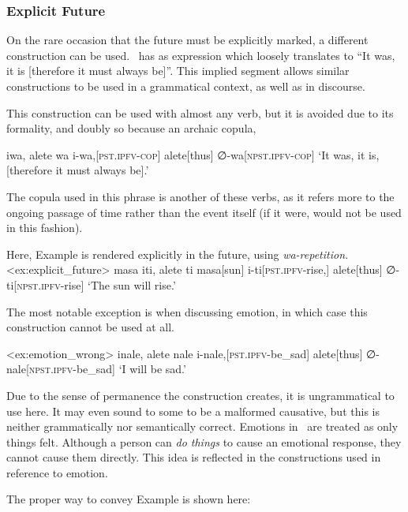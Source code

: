 \subsubsection{Explicit Future}
On the rare occasion that the future must be explicitly marked, a different construction can be used.
\langname\ has as expression which loosely translates to ``It was, it is [therefore it must always be]''.
This implied segment allows similar constructions to be used in a grammatical context, as well as in discourse.

This construction can be used with almost any verb, but it is avoided due to its formality, and doubly so because an archaic copula, 

\ex
\begingl
\glpreamble iwa, alete wa
\endpreamble
i-wa,[\textsc{pst.ipfv-cop}]
alete[thus]
∅-wa[\textsc{npst.ipfv-cop}]
\glft `It was, it is, [therefore it must always be].'
\endgl
\xe

The copula used in this phrase is another of these verbs, as it refers more to the ongoing passage of time rather than the event itself (if it were,  would not be used in this fashion).

Here, Example  is rendered explicitly in the future, using \textit{wa-repetition.}
\ex<ex:explicit_future>
\begingl
\glpreamble masa iti, alete ti
\endpreamble
masa[sun]
i-ti[\textsc{pst.ipfv-}rise,]
alete[thus]
∅-ti[\textsc{npst.ipfv-}rise]
\glft `The sun will rise.'
\endgl
\xe

The most notable exception is when discussing emotion, in which case this construction cannot be used at all.

\ex<ex:emotion_wrong>
\begingl
\glpreamble \ljudge{*} inale, alete nale
\endpreamble
i-nale,[\textsc{pst.ipfv-}be\_sad]
alete[thus]
∅-nale[\textsc{npst.ipfv-}be\_sad]
\glft `I will be sad.'
\endgl
\xe

Due to the sense of permanence the construction creates, it is ungrammatical to use here.
It may even sound to some to be a malformed causative, but this is neither grammatically nor semantically correct.
Emotions in \langname\ are treated as only things felt.
Although a person can \textit{do things} to cause an emotional response, they cannot cause them directly.
This idea is reflected in the constructions used in reference to emotion.

The proper way to convey Example  is shown here:

